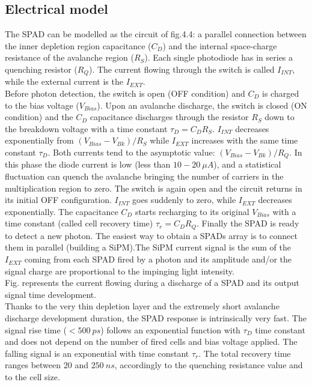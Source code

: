 \subsection*{Electrical model}
The SPAD can be modelled as the circuit of fig.4.4:  a parallel connection between the inner depletion region capacitance ($C_D$) and the internal space-charge resistance of the avalanche region ($R_S$). Each single photodiode has in series a quenching resistor ($R_Q$). The current flowing through the switch is called $I_{INT}$, while the external current is the $I_{EXT}$.\\
Before photon detection, the switch is open (OFF condition) and $C_D$ is charged to the bias voltage ($V_{Bias}$). Upon an avalanche discharge, the switch is closed (ON condition) and the $C_D$ capacitance discharges through the resistor $R_S$ down to the breakdown voltage with a time constant $\tau_D=C_D R_S$. $I_{INT}$ decreases exponentially from $(V_{Bias}-V_{Bk})/R_S$ while $I_{EXT}$ increases with the same time constant $\tau_D$. Both currents tend to the asymptotic value: $(V_{Bias}-V_{Bk})/R_Q$. In this phase the diode current is low (less than $10-20\ \mu A$), and a statistical fluctuation can quench the avalanche bringing the number of carriers in the multiplication region to zero.
The switch is again open and the circuit returns in its initial OFF configuration. $I_{INT}$ goes suddenly to zero, while $I_{EXT}$ decreases exponentially. The capacitance $C_D$ starts recharging to its original $V_{Bias}$ with a time constant (called cell recovery time) $\tau_r=C_D R_Q$. Finally the SPAD is ready to detect a new photon. The easiest way to obtain a SPADs array is to connect them in parallel (building a SiPM).The SiPM current signal is the sum of the $I_{EXT}$ coming from each SPAD fired by a photon and its amplitude and/or the signal charge are proportional to the impinging light intensity.\\
Fig. represents the current flowing during a discharge of a SPAD and its output signal time development.\\
Thanks to the very thin depletion layer and the extremely short avalanche discharge development duration, the SPAD response is intrinsically very fast. The signal rise time ($< 500\ ps$) follows an exponential function with $\tau_D$ time constant and does not depend on the number of fired cells and bias voltage applied. The falling signal is an exponential with time constant $\tau_r$. The total recovery time ranges between $20$ and $250\ ns$, accordingly to the quenching resistance value and to the cell size.\\


